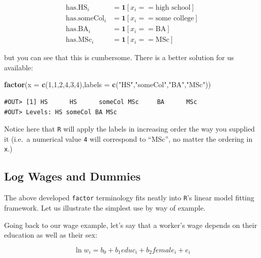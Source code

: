 \documentclass[]{book}
\newenvironment{Shaded}{\begin{snugshade}}{\end{snugshade}}
\newcommand{\DataTypeTok}[1]{\textcolor[rgb]{0.13,0.29,0.53}{#1}}
\newcommand{\DecValTok}[1]{\textcolor[rgb]{0.00,0.00,0.81}{#1}}
\newcommand{\KeywordTok}[1]{\textcolor[rgb]{0.13,0.29,0.53}{\textbf{#1}}}
\newcommand{\NormalTok}[1]{#1}
\newcommand{\StringTok}[1]{\textcolor[rgb]{0.31,0.60,0.02}{#1}}
\begin{document}
\begin{align*}
\text{has.HS}_i &= \mathbf{1}[x_i==\text{high school}] \\
\text{has.someCol}_i &= \mathbf{1}[x_i==\text{some college}] \\
\text{has.BA}_i &= \mathbf{1}[x_i==\text{BA}] \\
\text{has.MSc}_i &= \mathbf{1}[x_i==\text{MSc}] 
\end{align*}

but you can see that this is cumbersome. There is a better solution for us available:

\begin{Shaded}
\begin{Highlighting}[]
\KeywordTok{factor}\NormalTok{(}\DataTypeTok{x =} \KeywordTok{c}\NormalTok{(}\DecValTok{1}\NormalTok{,}\DecValTok{1}\NormalTok{,}\DecValTok{2}\NormalTok{,}\DecValTok{4}\NormalTok{,}\DecValTok{3}\NormalTok{,}\DecValTok{4}\NormalTok{),}\DataTypeTok{labels =} \KeywordTok{c}\NormalTok{(}\StringTok{"HS"}\NormalTok{,}\StringTok{"someCol"}\NormalTok{,}\StringTok{"BA"}\NormalTok{,}\StringTok{"MSc"}\NormalTok{))}
\end{Highlighting}
\end{Shaded}

\begin{verbatim}
#OUT> [1] HS      HS      someCol MSc     BA      MSc    
#OUT> Levels: HS someCol BA MSc
\end{verbatim}

Notice here that \texttt{R} will apply the labels in increasing order the way you supplied it (i.e.~a numerical value \texttt{4} will correspond to ``MSc'', no matter the ordering in \texttt{x}.)

\hypertarget{factors}{%
\subsection{Log Wages and Dummies}\label{factors}}

The above developed \texttt{factor} terminology fits neatly into \texttt{R}'s linear model fitting framework. Let us illustrate the simplest use by way of example.

Going back to our wage example, let's say that a worker's wage depends on their education as well as their sex:

\begin{equation}
\ln w_i = b_0 + b_1 educ_i + b_2 female_i + e_i \label{eq:wage-sex}
\end{equation}
\end{document}
